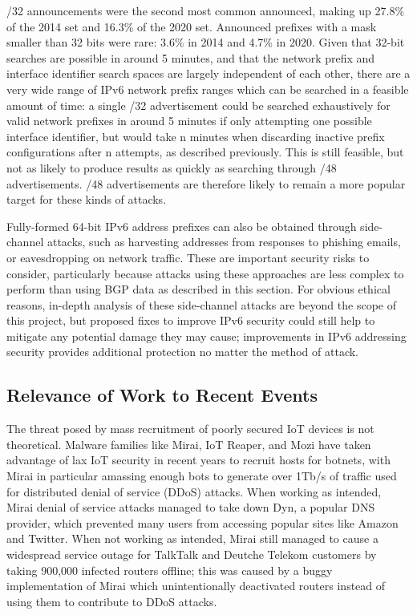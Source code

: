 \documentclass[10pt,sigconf]{acmart}
\begin{document}
/32 announcements were the second most common announced, making up 27.8\% of the 2014 set and 16.3\% of the 2020 set.
Announced prefixes with a mask smaller than 32 bits were rare:
3.6\% in 2014 and 4.7\% in 2020.
Given that 32-bit searches are possible in around 5 minutes, and that the network prefix and interface identifier search spaces are largely independent of each other, there are a very wide range of IPv6 network prefix ranges which can be searched in a feasible amount of time:
a single /32 advertisement could be searched exhaustively for valid network prefixes in around 5 minutes if only attempting one possible interface identifier, but would take n minutes when discarding inactive prefix configurations after n attempts, as described previously.
This is still feasible, but not as likely to produce results as quickly as searching through /48 advertisements.
/48 advertisements are therefore likely to remain a more popular target for these kinds of attacks.


Fully-formed 64-bit IPv6 address prefixes can also be obtained through side-channel attacks, such as harvesting addresses from responses to phishing emails, or eavesdropping on network traffic.
These are important security risks to consider, particularly because attacks using these approaches are less complex to perform than using BGP data as described in this section.
For obvious ethical reasons, in-depth analysis of these side-channel attacks are beyond the scope of this project, but proposed fixes to improve IPv6 security could still help to mitigate any potential damage they may cause;
improvements in IPv6 addressing security provides additional protection no matter the method of attack.

\subsection{Relevance of Work to Recent Events}
The threat posed by mass recruitment of poorly secured IoT devices is not theoretical.
Malware families like Mirai, IoT Reaper, and Mozi have taken advantage of lax IoT security in recent years to recruit hosts for botnets, with Mirai in particular amassing enough bots to generate over 1Tb/s of traffic used for distributed denial of service (DDoS) attacks.
When working as intended, Mirai denial of service attacks managed to take down Dyn, a popular DNS provider, which prevented many users from accessing popular sites like Amazon and Twitter.
When not working as intended, Mirai still managed to cause a widespread service outage for TalkTalk and Deutche Telekom customers by taking 900,000 infected routers offline;
this was caused by a buggy implementation of Mirai which unintentionally deactivated routers instead of using them to contribute to DDoS attacks.
\end{document}
